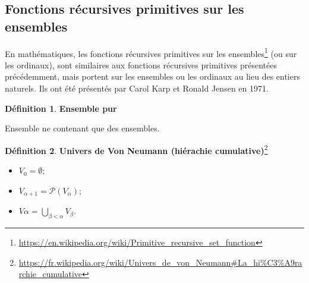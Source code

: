 \documentclass{book}
\theoremstyle{definition}
\newtheorem{definition}{Définition}
\numberwithin{lemma}{subsection}
\numberwithin{theorem}{subsection}
\numberwithin{definition}{subsection}
\numberwithin{proposition}{subsection}
\numberwithin{corollary}{subsection}
\numberwithin{property}{subsection}
\numberwithin{example}{subsection}
\numberwithin{heuristique}{subsection}
\numberwithin{scenario}{subsection}
\begin{document}
        \subsection{Fonctions récursives primitives sur les ensembles}
                En mathématiques, les fonctions récursives primitives sur les ensembles\footnote{\url{https://en.wikipedia.org/wiki/Primitive\_recursive\_set\_function}} (ou sur les ordinaux), sont similaires aux fonctions récursives primitives présentées précédemment, mais portent sur les ensembles ou les ordinaux au lieu des entiers naturels. Ils ont été présentés par Carol Karp et Ronald Jensen en 1971.
                \begin{definition}\textbf{Ensemble pur}
                \par Ensemble ne contenant que des ensembles.
                \end{definition}
                \begin{definition}\textbf{Univers de Von Neumann (hiérachie cumulative)}\footnote{\url{https://fr.wikipedia.org/wiki/Univers\_de\_von\_Neumann\#La\_hi\%C3\%A9rarchie\_cumulative}}
                    \begin{itemize}
                        \item $V_0 = \emptyset$;
                        \item $V_{\alpha+1} = \mathcal{P}(V_\alpha)$;
                        \item $V\alpha = \bigcup\limits_{\beta<\alpha}V_\beta$.
                    \end{itemize}
                \end{definition}
\end{document}
